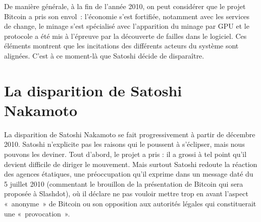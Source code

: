 De manière générale, à la fin de l'année 2010, on peut considérer que le projet Bitcoin a pris son envol~: l'économie s'est fortifiée, notamment avec les services de change, le minage s'est spécialisé avec l'apparition du minage par GPU et le protocole a été mis à l'épreuve par la découverte de failles dans le logiciel. Ces éléments montrent que les incitations des différents acteurs du système sont alignées. C'est à ce moment-là que Satoshi décide de disparaître.


\section*{La disparition de Satoshi Nakamoto}

La disparition de Satoshi Nakamoto se fait progressivement à partir de décembre 2010. Satoshi n'explicite pas les raisons qui le poussent à s'éclipser, mais nous pouvons les deviner. Tout d'abord, le projet a pris : il a grossi à tel point qu'il devient difficile de diriger le mouvement. Mais surtout Satoshi redoute la réaction des agences étatiques, une préoccupation qu'il exprime dans un message daté du 5 juillet 2010 (commentant le brouillon de la présentation de Bitcoin qui sera proposée à Slashdot), où il déclare ne pas vouloir mettre trop en avant l'aspect «~anonyme~» de Bitcoin ou son opposition aux autorités légales qui constituerait une «~provocation~».


